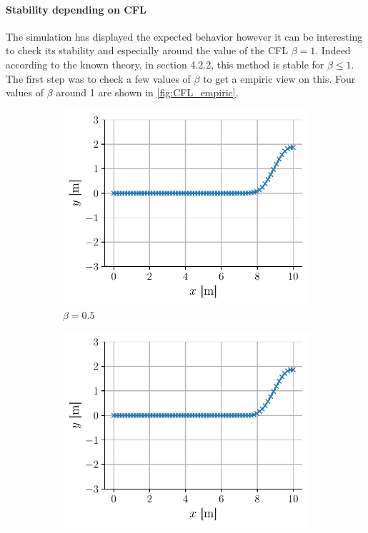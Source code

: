 \paragraph{Stability depending on CFL} The simulation has displayed the expected behavior however it can be interesting to check its stability and especially around the value of the CFL $\beta = 1$. Indeed according to the known theory, \cite{physnumbook} in section 4.2.2, this method is stable for $\beta \leq 1$. The first step was to check a few values of $\beta$ to get a empiric view on this. Four values of $\beta$ around 1 are shown in \autoref{fig:CFL_empiric}.
\begin{figure}[h]
    \centering
    \begin{subfigure}{0.48\linewidth}
        \includegraphics[width=\linewidth]{figures/bassin_default_CFL0.5_1.15s.pdf}
        \caption{$\beta = 0.5$}
        \label{fig:CFL_0.5}
    \end{subfigure}
    \begin{subfigure}{0.48\linewidth}
        \includegraphics[width=\linewidth]{figures/bassin_default_CFL1_1.15s.pdf}

\end{subfigure}
\end{figure}
